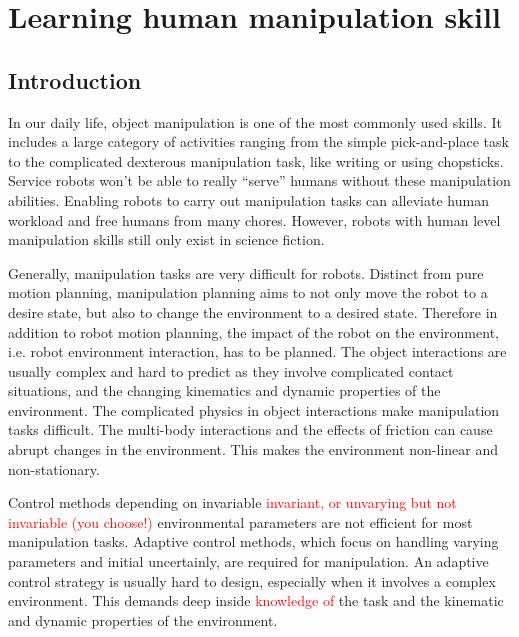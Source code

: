 \chapter{Learning human manipulation skill}
\label{cha4}

\section{Introduction}
\label{cha4:sec1}
In our daily life, object manipulation is one of the most commonly used skills. It includes a large category of activities ranging from the simple pick-and-place task to the complicated dexterous manipulation task, like writing or using chopsticks. Service robots won't be able to really ``serve'' humans without these manipulation abilities. Enabling robots to carry out manipulation tasks can alleviate human workload and free humans from many chores. However, robots with human level manipulation skills still only exist in science fiction.

Generally, manipulation tasks are very difficult for robots. Distinct from pure motion planning, manipulation planning aims to not only move the robot to a desire state, but also to change the environment to a desired state. Therefore in addition to robot motion planning, the impact of the robot on the environment, i.e. robot environment interaction, has to be planned. The object interactions are usually complex and hard to predict as they involve complicated contact situations, and the changing kinematics and dynamic properties of the environment. The complicated physics in object interactions make manipulation tasks difficult. The multi-body interactions and the effects of friction can cause abrupt changes in the environment. This makes the environment non-linear and non-stationary.

Control methods depending on invariable 
\textcolor{red}{invariant, or unvarying but not invariable (you choose!)}
environmental parameters are not efficient for most manipulation tasks. Adaptive control methods, which focus on handling varying parameters and initial uncertainly, are required for manipulation. An adaptive control strategy is usually hard to design, especially when it involves a complex environment. This demands deep inside \textcolor{red}{knowledge of} the task and the kinematic and dynamic properties of the environment.

